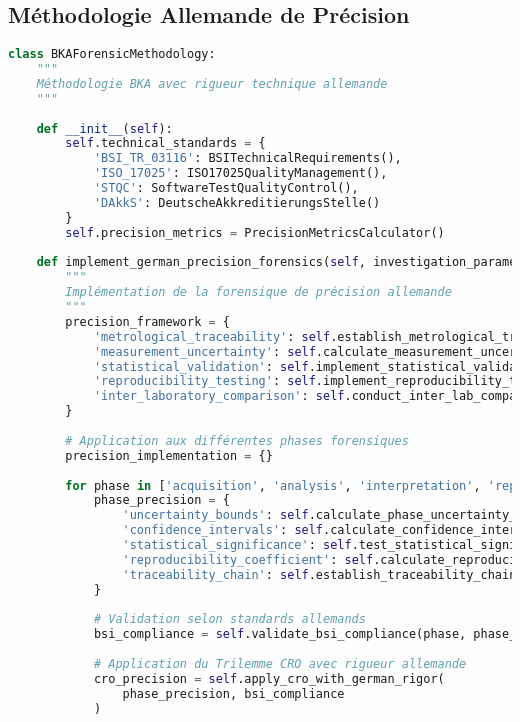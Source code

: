 \subsection{Méthodologie Allemande de Précision}

\begin{lstlisting}[language=Python, caption=Framework BKA avec rigueur technique allemande]
class BKAForensicMethodology:
    """
    Méthodologie BKA avec rigueur technique allemande
    """
    
    def __init__(self):
        self.technical_standards = {
            'BSI_TR_03116': BSITechnicalRequirements(),
            'ISO_17025': ISO17025QualityManagement(),
            'STQC': SoftwareTestQualityControl(),
            'DAkkS': DeutscheAkkreditierungsStelle()
        }
        self.precision_metrics = PrecisionMetricsCalculator()
        
    def implement_german_precision_forensics(self, investigation_parameters):
        """
        Implémentation de la forensique de précision allemande
        """
        precision_framework = {
            'metrological_traceability': self.establish_metrological_traceability(),
            'measurement_uncertainty': self.calculate_measurement_uncertainties(),
            'statistical_validation': self.implement_statistical_validation(),
            'reproducibility_testing': self.implement_reproducibility_testing(),
            'inter_laboratory_comparison': self.conduct_inter_lab_comparison()
        }
        
        # Application aux différentes phases forensiques
        precision_implementation = {}
        
        for phase in ['acquisition', 'analysis', 'interpretation', 'reporting']:
            phase_precision = {
                'uncertainty_bounds': self.calculate_phase_uncertainty_bounds(phase),
                'confidence_intervals': self.calculate_confidence_intervals(phase),
                'statistical_significance': self.test_statistical_significance(phase),
                'reproducibility_coefficient': self.calculate_reproducibility(phase),
                'traceability_chain': self.establish_traceability_chain(phase)
            }
            
            # Validation selon standards allemands
            bsi_compliance = self.validate_bsi_compliance(phase, phase_precision)
            
            # Application du Trilemme CRO avec rigueur allemande
            cro_precision = self.apply_cro_with_german_rigor(
                phase_precision, bsi_compliance
            )
            

\end{lstlisting}
